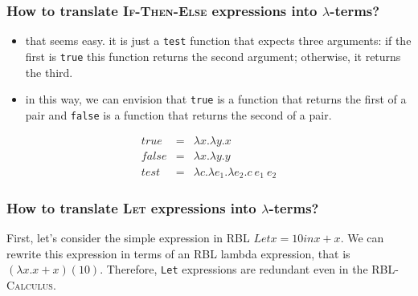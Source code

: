 \documentclass{beamer}
\begin{document}
\begin{frame}
  \frametitle{How to translate \textsc{If-Then-Else} expressions into $\lambda$-terms?} 

  \begin{itemize}
    \item that seems easy. it is just a \texttt{test} function that 
    expects three arguments: if the first is \texttt{true} 
    this function returns the second argument; otherwise, 
    it returns the third.  \pause 

    \item in this way, we can envision that \texttt{true} is a 
    function that returns the first of a pair and \texttt{false} is 
    a function that returns the second of a pair.  \pause 
  \end{itemize} 

  \begin{center}
    \begin{eqnarray*}
      true  & = & \lambda x . \lambda y . x \\
      false & = & \lambda x . \lambda y . y  \\
      test  & = & \lambda c . \lambda e_1 . \lambda e_2 . c\ e_1\ e_2 
    \end{eqnarray*}
  \end{center}

\end{frame}

\begin{frame}
 \frametitle{How to translate \textsc{Let} expressions into $\lambda$-terms?} 

 First, let's consider the simple expression in \textsc{RBL} $Let x = 10 in x + x$. \pause 
 We can rewrite this expression in terms of an \textsc{RBL} lambda expression\pause, that is 
 $(\lambda x . x + x) (10)$. Therefore, \texttt{Let} expressions are redundant even in 
 the \textsc{RBL-Calculus}.
  
\end{frame}
\end{document}
